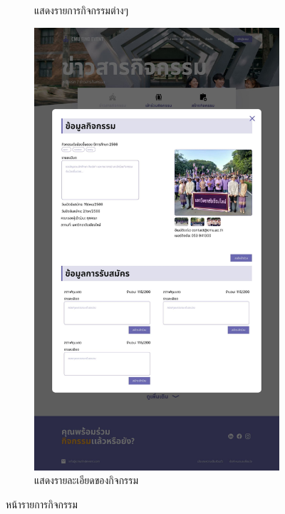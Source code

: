 \begin{figure}[h]
\begin{subfigure}[b]{0.3\linewidth}
    \caption{แสดงรายการกิจกรรมต่างๆ}
  \end{subfigure}
  \hfill
  \begin{subfigure}[b]{0.3\linewidth}
    \includegraphics[width=\linewidth]{image/Figma-design/New-Event-info2.jpg}
    \caption{แสดงรายละเอียดของกิจกรรม}
  \end{subfigure}
  \caption{หน้ารายการกิจกรรม}
  \label{fig:event-info}
\end{figure}

